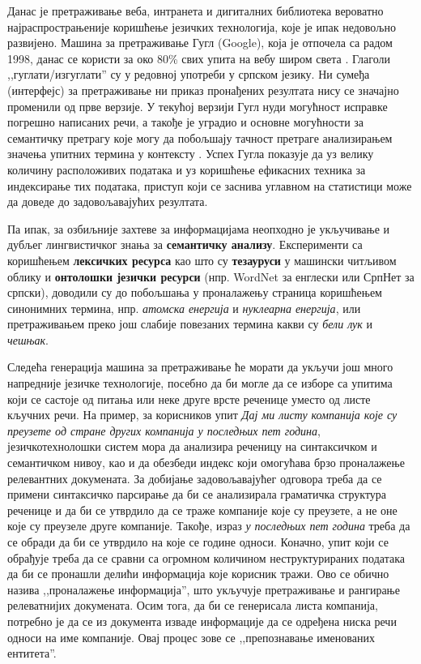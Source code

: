 \begin{multicols}{2}
Данас је претраживање веба, интранета и дигиталних библиотека вероватно најраспрострањеније коришћење језичких технологија, које је ипак недовољно развијено. Машина за претраживање Гугл (Google), која је отпочела са радом 1998, данас се користи за око 80\% свих упита на вебу широм света \cite{SPIEGEL}. Глаголи ,,гуглати/изгуглати'' су у редовној употреби у српском језику. Ни сумеђа (интерфејс) за претраживање ни приказ пронађених резултата нису се значајно променили од прве верзије. У текућој верзији Гугл нуди могућност исправке погрешно написаних речи, а такође је уградио и основне могућности за семантичку претрагу које могу да побољшају тачност претраге анализирањем значења упитних термина у контексту \cite{PCWORLD}.  Успех Гугла показује да уз велику количину расположивих података и уз коришћење ефикасних техника за индексирање тих података, приступ који се заснива углавном на статистици може да доведе до задовољавајућих резултата.  

Па ипак, за озбиљније захтеве за информацијама неопходно је укључивање и дубљег лингвистичког знања за \textbf{семантичку анализу}. Експерименти са коришћењем \textbf{лексичких ресурса} као што су \textbf{тезауруси} у машински читљивом облику и \textbf{онтолошки језички ресурси} (нпр. WordNet за енглески или СрпНет за српски), доводили су до побољшања у проналажењу страница коришћењем синонимних термина, нпр. \textit{атомска енергија} и \textit{нуклеарна енергија}, или претраживањем преко још слабије повезаних термина какви су \textit{бели лук} и \textit{чешњак}. 


Следећа генерација машина за претраживање ће морати да укључи још много напредније језичке технологије, посебно да би могле да се изборе са упитима који се састоје од питања или неке друге врсте реченице уместо од листе кључних речи. На пример, за корисников упит \textit{Дај ми листу компанија које су преузете од стране других компанија у последњих пет година}, језичкотехнолошки систем мора да анализира реченицу на синтаксичком и семантичком нивоу, као и да обезбеди индекс који омогућава брзо проналажење релевантних докумената. За добијање задовољавајућег одговора треба да се примени синтаксичко парсирање да би се анализирала граматичка структура реченице и да би се утврдило да се траже компаније које су преузете, а не оне које су преузеле друге компаније. Такође, израз \textit{у последњих пет година} треба да се обради да би се утврдило на које се године односи. Коначно, упит који се обрађује треба да се сравни са огромном количином неструктурираних података да би се пронашли делићи информација које корисник тражи. Ово се обично назива ,,проналажење информација'', што укључује претраживање и рангирање релеватнијих докумената. Осим тога, да би се генерисала листа компанија, потребно је да се из документа  изваде информације да се одређена ниска речи односи на име компаније. Овај процес зове се ,,препознавање именованих ентитета''. 


\end{multicols}
